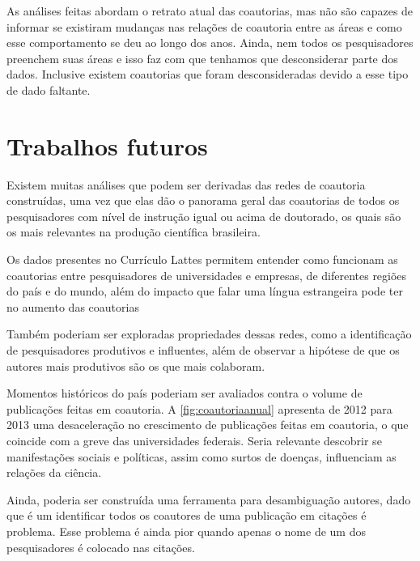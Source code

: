 As análises feitas abordam o retrato atual das coautorias, mas não são capazes de informar se existiram mudanças nas relações de coautoria entre as áreas e como esse comportamento se deu ao longo dos anos. Ainda, nem todos os pesquisadores preenchem suas áreas e isso faz com que tenhamos que desconsiderar parte dos dados. Inclusive existem coautorias que foram desconsideradas devido a esse tipo de dado faltante.

\section{Trabalhos futuros}

Existem muitas análises que podem ser derivadas das redes de coautoria construídas, uma vez que elas dão o panorama geral das coautorias de todos os pesquisadores com nível de instrução igual ou acima de doutorado, os quais são os mais relevantes na produção científica brasileira.

Os dados presentes no Currículo Lattes permitem entender como funcionam as coautorias entre pesquisadores de universidades e empresas, de diferentes regiões do país e do mundo, além do impacto que falar uma língua estrangeira pode ter no aumento das coautorias

Também poderiam ser exploradas propriedades dessas redes, como a identificação de pesquisadores produtivos e influentes, além de observar a hipótese de que os autores mais produtivos são os que mais colaboram.

Momentos históricos do país poderiam ser avaliados contra o volume de publicações feitas em coautoria. A \autoref{fig:coautoriaanual} apresenta de 2012 para 2013 uma desaceleração no crescimento de publicações feitas em coautoria, o que coincide com a greve das universidades federais. Seria relevante descobrir se manifestações sociais e políticas, assim como surtos de doenças, influenciam as relações da ciência.

Ainda, poderia ser construída uma ferramenta para desambiguação autores, dado que é um identificar todos os coautores de uma publicação em citações é problema. Esse problema é ainda pior quando apenas o nome de um dos pesquisadores é colocado nas citações.
